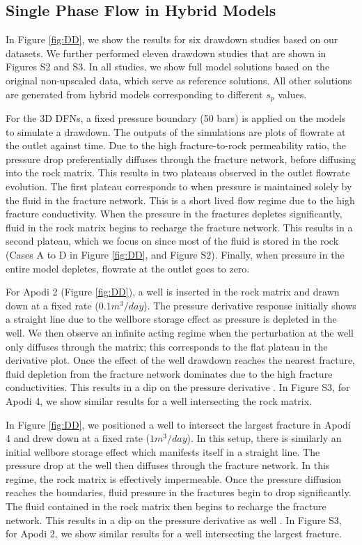 \documentclass[draft]{agujournal2018}
\begin{document}
\subsection{Single Phase Flow in Hybrid Models}
In Figure \ref{fig:DD}, we show the results for six drawdown studies based on our datasets. We further performed eleven drawdown studies that are shown in Figures S2 and S3. In all studies, we show full model solutions based on the original non-upscaled data, which serve as reference solutions. All other solutions are generated from hybrid models corresponding to different $s_p$ values. 

For the 3D DFNs, a fixed pressure boundary (50 bars) is applied on the models to simulate a drawdown. The outputs of the simulations are plots of flowrate at the outlet against time. Due to the high fracture-to-rock permeability ratio, the pressure drop preferentially diffuses through the fracture network, before diffusing into the rock matrix. This results in two plateaus observed in the outlet flowrate evolution. The first plateau corresponds to when pressure is maintained solely by the fluid in the fracture network. This is a short lived flow regime due to the high fracture conductivity. When the pressure in the fractures depletes significantly, fluid in the rock matrix begins to recharge the fracture network. This results in a second plateau, which we focus on since most of the fluid is stored in the rock (Cases A to D in Figure \ref{fig:DD}, and Figure S2). Finally, when pressure in the entire model depletes, flowrate at the outlet goes to zero.

For Apodi 2 (Figure \ref{fig:DD}), a well is inserted in the rock matrix and drawn down at a fixed rate ($0.1m^3/day$). The pressure derivative response initially shows a straight line due to the wellbore storage effect as pressure is depleted in the well. We then observe an infinite acting regime when the perturbation at the well only diffuses through the matrix; this corresponds to the flat plateau in the derivative plot. Once the effect of the well drawdown reaches the nearest fracture, fluid depletion from the fracture network dominates due to the high fracture conductivities. This results in a dip on the pressure derivative \citep{Bourdet1989, Cinco-Ley1976, Egya2018}. In Figure S3, for Apodi 4, we show similar results for a well intersecting the rock matrix.

In Figure \ref{fig:DD}, we positioned a well to intersect the largest fracture in Apodi 4 and drew down at a fixed rate ($1m^3/day$). In this setup, there is similarly an initial wellbore storage effect which manifests itself in a straight line. The pressure drop at the well then diffuses through the fracture network. In this regime, the rock matrix is effectively impermeable. Once the pressure diffusion reaches the boundaries, fluid pressure in the fractures begin to drop significantly. The fluid contained in the rock matrix then begins to recharge the fracture network. This results in a dip on the pressure derivative as well \citep{Gringarten1987}. In Figure S3, for Apodi 2, we show similar results for a well intersecting the largest fracture.
\end{document}
